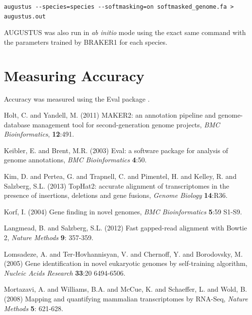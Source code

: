 \documentclass[a4paper,10pt]{report}
\begin{document}
\begin{verbatim}
augustus --species=species --softmasking=on softmasked_genome.fa > augustus.out 
\end{verbatim}

\noindent AUGUSTUS was also run in \textit{ab initio} mode using the exact same command with the parameters trained by BRAKER1 for each species.


\section{Measuring Accuracy}

Accuracy was measured using the Eval package \cite{Eval}.



\begin{thebibliography}{}
 Holt, C. and Yandell, M. (2011) MAKER2: an annotation pipeline and genome-database management tool for second-generation genome projects, \textit{BMC Bioinformatics}, \textbf{12}:491.

 Keibler, E. and Brent, M.R. (2003) Eval: a software package for analysis of genome annotations, \textit{BMC Bioinformatics} \textbf{4}:50.

 Kim, D. and Pertea, G. and Trapnell, C. and Pimentel, H. and Kelley, R. and Salzberg, S.L. (2013) TopHat2: accurate alignment of transcriptomes in the presence of insertions, deletions and gene fusions, {\it Genome Biology} \textbf{14}:R36.

 Korf, I. (2004) Gene finding in novel genomes, \textit{BMC Bioinformatics} \textbf{5}:59 S1-S9.

 Langmead, B. and Salzberg, S.L. (2012) Fast gapped-read alignment with Bowtie 2, \textit{Nature Methods} \textbf{9}: 357-359.

 Lomsadeze, A. and Ter-Hovhannisyan, V. and Chernoff, Y. and Borodovsky, M. (2005) Gene identification in novel eukaryotic genomes by self-training algorithm, \textit{Nucleic Acids Research} \textbf{33}:20 6494-6506.

 Mortazavi, A. and Williams, B.A. and McCue, K. and Schaeffer, L. and Wold, B. (2008) Mapping and quantifying mammalian transcriptomes by RNA-Seq, \textit{Nature Methods} \textbf{5}: 621-628.


\end{thebibliography}
\end{document}
